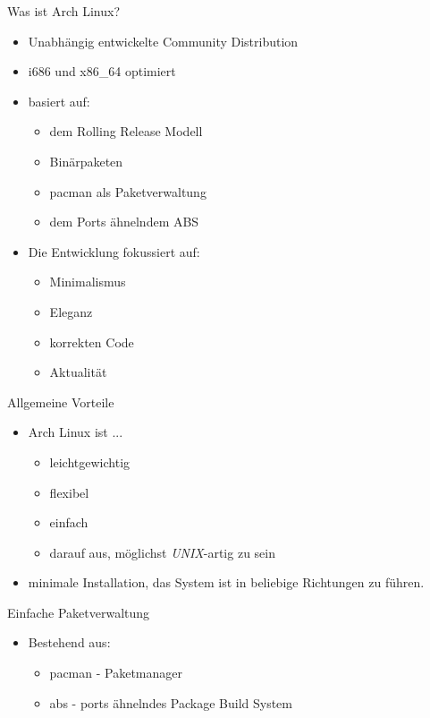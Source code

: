 
\begin{slide}{Was ist Arch Linux?}
	\begin{itemize}
		\item{Unabh\"{a}ngig entwickelte Community Distribution}
		\item{i686 und x86\_64 optimiert}
		\item{basiert auf:
			\begin{itemize}
				\item{dem Rolling Release Modell}
				\item{Bin\"{a}rpaketen}
				\item{pacman als Paketverwaltung}
				\item{dem Ports \"{a}hnelndem ABS}
			\end{itemize}
		}
		\item{Die Entwicklung fokussiert auf:
			\begin{itemize}
				\item{Minimalismus}
				\item{Eleganz}
				\item{korrekten Code}
				\item{Aktualit\"{a}t}
			\end{itemize}
		}
	\end{itemize}
\end{slide}

\begin{slide}{Allgemeine Vorteile}
	\begin{itemize}
		\item{Arch Linux ist ...
			\begin{itemize}
				\item{leichtgewichtig}
				\item{flexibel}
				\item{einfach}
				\item{darauf aus, m\"{o}glichst \textit{UNIX}-artig zu sein}
			\end{itemize}
		}
		\item{minimale Installation, das System ist in beliebige
			Richtungen zu f\"{u}hren.}
	\end{itemize}
\end{slide}

\begin{slide}{Einfache Paketverwaltung}
	\begin{itemize}
		\item{Bestehend aus:
			\begin{itemize}
				\item{pacman - Paketmanager}
				\item{abs - ports \"{a}hnelndes Package Build System}
			\end{itemize}
		}
	\end{itemize}
\end{slide}

